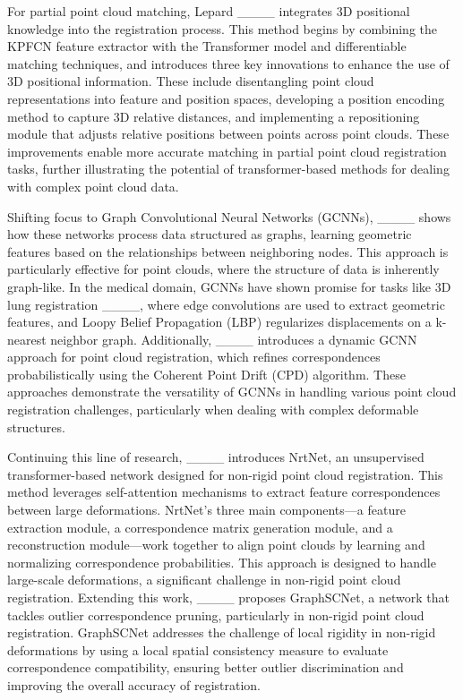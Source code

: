 For partial point cloud matching, Lepard ____ integrates 3D positional knowledge into the registration process. This method begins by combining the KPFCN feature extractor with the Transformer model and differentiable matching techniques, and introduces three key innovations to enhance the use of 3D positional information. These include disentangling point cloud representations into feature and position spaces, developing a position encoding method to capture 3D relative distances, and implementing a repositioning module that adjusts relative positions between points across point clouds. These improvements enable more accurate matching in partial point cloud registration tasks, further illustrating the potential of transformer-based methods for dealing with complex point cloud data.

Shifting focus to Graph Convolutional Neural Networks (GCNNs), ____ shows how these networks process data structured as graphs, learning geometric features based on the relationships between neighboring nodes. This approach is particularly effective for point clouds, where the structure of data is inherently graph-like. In the medical domain, GCNNs have shown promise for tasks like 3D lung registration ____, where edge convolutions are used to extract geometric features, and Loopy Belief Propagation (LBP) regularizes displacements on a k-nearest neighbor graph. Additionally, ____ introduces a dynamic GCNN approach for point cloud registration, which refines correspondences probabilistically using the Coherent Point Drift (CPD) algorithm. These approaches demonstrate the versatility of GCNNs in handling various point cloud registration challenges, particularly when dealing with complex deformable structures.

Continuing this line of research, ____ introduces NrtNet, an unsupervised transformer-based network designed for non-rigid point cloud registration. This method leverages self-attention mechanisms to extract feature correspondences between large deformations. NrtNet's three main components—a feature extraction module, a correspondence matrix generation module, and a reconstruction module—work together to align point clouds by learning and normalizing correspondence probabilities. This approach is designed to handle large-scale deformations, a significant challenge in non-rigid point cloud registration. Extending this work, ____ proposes GraphSCNet, a network that tackles outlier correspondence pruning, particularly in non-rigid point cloud registration. GraphSCNet addresses the challenge of local rigidity in non-rigid deformations by using a local spatial consistency measure to evaluate correspondence compatibility, ensuring better outlier discrimination and improving the overall accuracy of registration.

